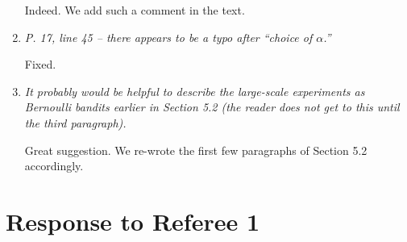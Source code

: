 \documentclass[11pt]{article}
\newcommand{\1}{\ensuremath{\mathbf{1}}} %
\theoremstyle{thm-sf}
\begin{document}
\begin{enumerate}
	Indeed. We add such a comment in the text. 
	
	\item {\it  P. 17, line 45 – there appears to be a typo after “choice of $\alpha$.”}
	
	Fixed.
	
	\item {\it It probably would be helpful to describe the large-scale experiments as Bernoulli bandits earlier in Section 5.2 (the reader does not get to this until the third paragraph).}
	
	Great suggestion. We re-wrote the first few paragraphs of Section 5.2 accordingly.
	\end{enumerate}
	
	\newpage
	\section{Response to  Referee 1}
	
\end{document}
